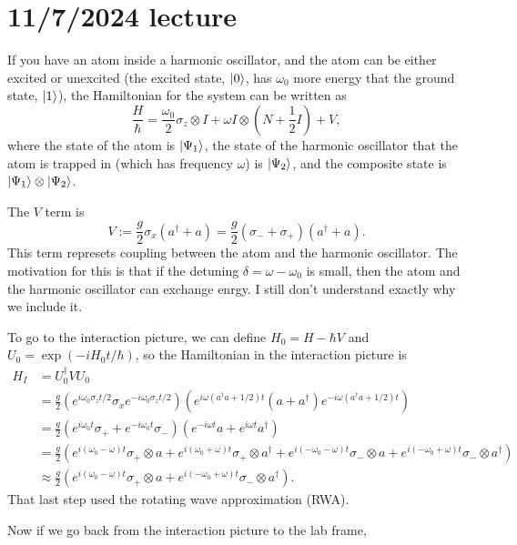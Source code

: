 \documentclass{article}
\begin{document}
\section{11/7/2024 lecture}
If you have an atom inside a harmonic oscillator, and the atom can be either excited or unexcited (the excited state, $\left\lvert 0 \right\rangle$, has $\omega_0$ more energy that the ground state, $\left\lvert 1 \right\rangle$), the Hamiltonian for the system can be written as
\[ \frac{H}{\hbar} = \frac{\omega_0}{2} \sigma_z \otimes I + \omega I \otimes \left( N + \frac{1}{2} I \right) + V, \]
where the state of the atom is $\left\lvert \Psi_1 \right\rangle$, the state of the harmonic oscillator that the atom is trapped in (which has frequency $\omega$) is $\left\lvert \Psi_2 \right\rangle$, and the composite state is $\left\lvert \Psi_1 \right\rangle \otimes \left\lvert \Psi_2 \right\rangle$.
\par
The $V$ term is
\[ V := \frac{g}{2} \sigma_x \left( a^\dag + a \right) = \frac{g}{2} \left( \sigma_- + \sigma_+ \right) \left( a^\dag + a \right). \]
This term represets coupling between the atom and the harmonic oscillator. The motivation for this is that if the detuning $\delta = \omega - \omega_0$ is small, then the atom and the harmonic oscillator can exchange enrgy. I still don't understand exactly why we include it.
\par
To go to the interaction picture, we can define $H_0 = H - \hbar V$ and $U_0 = \exp \left( -i H_0 t/\hbar \right) $, so the Hamiltonian in the interaction picture is
\begin{align*}
    H_I &= U_0^\dag V U_0 \\
        &= \frac{g}{2} \left( e^{i \omega_0 \sigma_z t / 2} \sigma_x e^{-i \omega_0 \sigma_z t / 2} \right) \left( e^{i \omega (a^\dag a + 1/2)t} (a+a^\dag) e^{- i \omega (a^\dag a + 1/2)t} \right) \\
        &= \frac{g}{2} \left( e^{i \omega_0 t} \sigma_+ + e^{-i \omega_0 t} \sigma_- \right) \left( e^{-i \omega t} a + e^{i \omega t} a^\dag \right) \\
        &= \frac{g}{2} \left( e^{i (\omega_0-\omega) t} \sigma_+ \otimes a + e^{i (\omega_0+\omega) t} \sigma_+ \otimes a^\dag + e^{i (-\omega_0-\omega) t} \sigma_- \otimes a + e^{i (-\omega_0+\omega) t} \sigma_- \otimes a^\dag \right) \\
        &\approx \frac{g}{2} \left( e^{i (\omega_0-\omega) t} \sigma_+ \otimes a + e^{i (-\omega_0+\omega) t} \sigma_- \otimes a^\dag \right).
\end{align*}
That last step used the rotating wave approximation (RWA).
\par
Now if we go back from the interaction picture to the lab frame,
\end{document}
